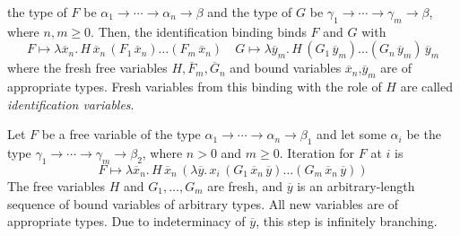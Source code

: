 \begin{description}[itemsep=1\jot]
    the type of $F$ be $\alpha_1 \rightarrow \cdots \rightarrow \alpha_n
    \rightarrow \beta$ and the type of $G$ be $\gamma_1 \rightarrow \cdots
    \rightarrow \gamma_m \rightarrow \beta$, where $n,m\geq 0$. Then, the identification binding binds
    $F$ and $G$ with
    \begin{equation*}
        F \mapsto \lambda \overline{x}_n. \, H \, \overline{x}_n \, (F_1 \, \overline{x}_n)
        \ldots (F_m \, \overline{x}_n) \quad
        G \mapsto \lambda \overline{y}_m. \,
        H \, (G_1 \, \overline{y}_m) \ldots (G_n \, \overline{y}_m) \, \overline{y}_m
    \end{equation*}
    where the fresh free variables $H,\overline{F}_m,\overline{G}_n$ and bound
    variables $\overline{x}_n$,$\overline{y}_m$ are of appropriate types. 
    Fresh variables from this binding with the role of $H$ are called \emph{identification variables}.
    \item[Iteration for $F$]
    Let $F$ be a free variable of the type $\alpha_1 \rightarrow \cdots
    \rightarrow \alpha_n \rightarrow \beta_1$ and let some $\alpha_i$ be the
    type $\gamma_1 \rightarrow \cdots \rightarrow \gamma_m \rightarrow
    \beta_2$, where $n>0$ and $m\geq 0$. Iteration for $F$ at $i$ is  
    \[ F \mapsto \lambda \overline{x}_n.\,H\,\overline{x}_n \, (\lambda
    \overline{y}.\,x_i \, (G_1 \, \overline{x}_n \, \overline{y}) \ldots (G_m \,
    \overline{x}_n \, \overline{y}) )\]
    The free variables $H$ and $G_1, \ldots,
    G_m$ are fresh, and $\overline{y}$ is an arbitrary-length sequence of bound
    variables of arbitrary types. All new variables are of
    appropriate types. Due to indeterminacy of $\overline{y}$, this step is
    infinitely branching. 
    

\end{description}

